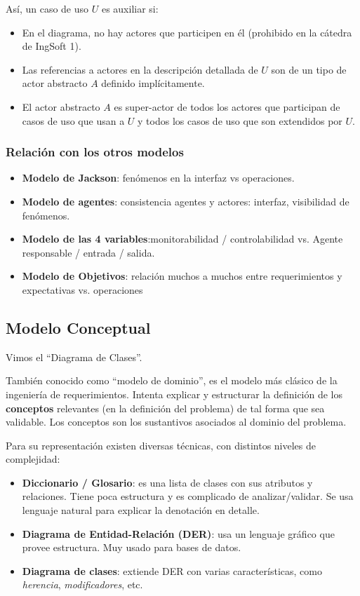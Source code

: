 \documentclass[]{article}
\begin{document}
Así, un caso de uso $U$ es auxiliar si:
\begin{itemize}
	\item En el diagrama, no hay actores que participen en él (prohibido en la cátedra de IngSoft 1).
	\item Las referencias a actores en la descripción detallada de $U$ son de un tipo de actor abstracto $A$ definido implícitamente.
	\item El actor abstracto $A$ es super-actor de todos los actores que participan de casos de uso que usan a $U$ y todos los casos de uso que son extendidos por $U$.
\end{itemize}

\subsubsection{Relación con los otros modelos}
\begin{itemize}
	\item \textbf{Modelo de Jackson}: fenómenos en la interfaz vs operaciones.
	\item \textbf{Modelo de agentes}: consistencia agentes y actores: interfaz, visibilidad de fenómenos.
	\item \textbf{Modelo de las 4 variables}:monitorabilidad / controlabilidad vs. Agente responsable / entrada / salida.
	\item \textbf{Modelo de Objetivos}: relación muchos a muchos entre requerimientos y expectativas vs. operaciones
\end{itemize}

\subsection{Modelo Conceptual}
Vimos el ``Diagrama de Clases''.

También conocido como ``modelo de dominio'', es el modelo más clásico de la ingeniería de requerimientos. Intenta explicar y estructurar la definición de los \textbf{conceptos} relevantes (en la definición del problema) de tal forma que sea validable. Los conceptos son los sustantivos asociados al dominio del problema.

Para su representación existen diversas técnicas, con distintos niveles de complejidad:
\begin{itemize}
	\item \textbf{Diccionario / Glosario}: es una lista de clases con sus atributos y relaciones. Tiene poca estructura y es complicado de analizar/validar. Se usa lenguaje natural para explicar la denotación en detalle.
	\item \textbf{Diagrama de Entidad-Relación (DER)}: usa un lenguaje gráfico que provee estructura. Muy usado para bases de datos.
	\item \textbf{Diagrama de clases}: extiende DER con varias características, como \textit{herencia}, \textit{modificadores}, etc.
\end{itemize}
\end{document}
